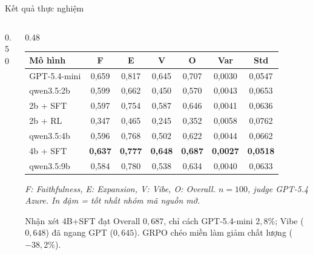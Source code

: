 \begin{frame}[t]{Kết quả thực nghiệm}
  \begin{columns}[T,onlytextwidth]
    \begin{column}{0.50\textwidth}
      \centering
    \end{column}
    \begin{column}{0.48\textwidth}
      \centering
      \scriptsize
      \setlength{\tabcolsep}{3pt}
      \begin{tabular}{@{}lcccccc@{}}
        \toprule
        Mô hình & F & E & V & O & Var & Std \\
        \midrule
        GPT-5.4-mini & 0,659 & 0,817 & 0,645 & 0,707 & 0,0030 & 0,0547 \\
        \midrule
        qwen3.5:2b & 0,599 & 0,662 & 0,450 & 0,570 & 0,0043 & 0,0653 \\
        2b + SFT & 0,597 & 0,754 & 0,587 & 0,646 & 0,0041 & 0,0636 \\
        2b + RL & 0,347 & 0,465 & 0,245 & 0,352 & 0,0058 & 0,0762 \\
        qwen3.5:4b & 0,596 & 0,768 & 0,502 & 0,622 & 0,0044 & 0,0662 \\
        4b + SFT & \textbf{0,637} & \textbf{0,777} & \textbf{0,648} & \textbf{0,687} & \textbf{0,0027} & \textbf{0,0518} \\
        qwen3.5:9b & 0,584 & 0,780 & 0,538 & 0,634 & 0,0040 & 0,0633 \\
        \bottomrule
      \end{tabular}

      \vspace{0.5em}
      {\scriptsize\itshape F: Faithfulness, E: Expansion, V: Vibe, O: Overall.
      $n=100$, judge GPT-5.4 Azure. In đậm = tốt nhất nhóm mã nguồn mở.}

      \vspace{0.4em}
      \begin{block}{Nhận xét}
        \scriptsize
        4B+SFT đạt Overall $0{,}687$, chỉ cách GPT-5.4-mini $2{,}8\%$;
        Vibe ($0{,}648$) đã ngang GPT ($0{,}645$). GRPO chéo miền làm
        giảm chất lượng ($-38{,}2\%$).
      \end{block}
    \end{column}
  \end{columns}
\end{frame}
